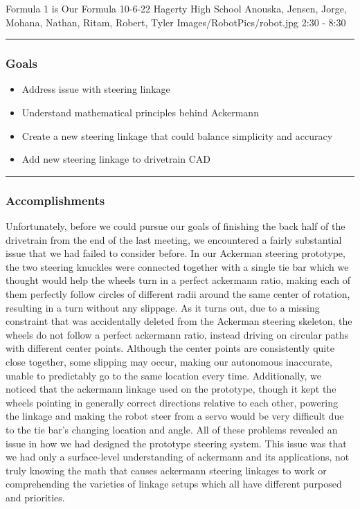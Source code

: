 \insertmeeting 
	{Formula 1 is Our Formula} 
	{10-6-22} 
	{Hagerty High School}
	{Anouska, Jensen, Jorge, Mohana, Nathan, Ritam, Robert, Tyler}
	{Images/RobotPics/robot.jpg}
	{2:30 - 8:30}
	
\noindent\hfil\rule{\textwidth}{.4pt}\hfil
\subsubsection*{Goals}
\begin{itemize}
    \item Address issue with steering linkage
    \item Understand mathematical principles behind Ackermann
    \item Create a new steering linkage that could balance simplicity and accuracy
    \item Add new steering linkage to drivetrain CAD

\end{itemize} 

\noindent\hfil\rule{\textwidth}{.4pt}\hfil

\subsubsection*{Accomplishments}
Unfortunately, before we could pursue our goals of finishing the back half of the drivetrain from the end of the last meeting, we encountered a fairly substantial issue that we had failed to consider before. In our Ackerman steering prototype, the two steering knuckles were connected together with a single tie bar which we thought would help the wheels turn in a perfect ackermann ratio, making each of them perfectly follow circles of different radii around the same center of rotation, resulting in a turn without any slippage. As it turns out, due to a missing constraint that was accidentally deleted from the Ackerman steering skeleton, the wheels do not follow a perfect ackermann ratio, instead driving on circular paths with different center points. Although the center points are consistently quite close together, some slipping may occur, making our autonomous inaccurate, unable to predictably go to the same location every time. Additionally, we noticed that the ackermann linkage used on the prototype, though it kept the wheels pointing in generally correct directions relative to each other, powering the linkage and making the robot steer from a servo would be very difficult due to the tie bar’s changing location and angle. All of these problems revealed an issue in how we had designed the prototype steering system. This issue was that we had only a surface-level understanding of ackermann and its applications, not truly knowing the math that causes ackermann steering linkages to work or comprehending the varieties of linkage setups which all have different purposed and priorities. 

